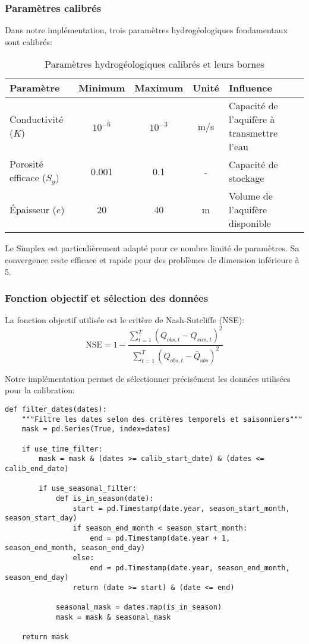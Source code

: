 \subsubsection{Paramètres calibrés}

Dans notre implémentation, trois paramètres hydrogéologiques fondamentaux sont calibrés:

\begin{table}[h]
\centering
\caption{Paramètres hydrogéologiques calibrés et leurs bornes}
\label{tab:parametres_calibres}
\begin{tabular}{|l|c|c|c|l|}
\hline
\textbf{Paramètre} & \textbf{Minimum} & \textbf{Maximum} & \textbf{Unité} & \textbf{Influence} \\
\hline
Conductivité ($K$) & $10^{-6}$ & $10^{-3}$ & m/s & Capacité de l'aquifère à transmettre l'eau \\
\hline
Porosité efficace ($S_y$) & 0.001 & 0.1 & - & Capacité de stockage \\
\hline
Épaisseur ($e$) & 20 & 40 & m & Volume de l'aquifère disponible \\
\hline
\end{tabular}
\end{table}

Le Simplex est particulièrement adapté pour ce nombre limité de paramètres. Sa convergence reste efficace et rapide pour des problèmes de dimension inférieure à 5.

\subsubsection{Fonction objectif et sélection des données}

La fonction objectif utilisée est le critère de Nash-Sutcliffe (NSE):
\begin{equation}\label{eq:nse}
\text{NSE} = 1 - \frac{\sum_{t=1}^{T}(Q_{obs,t} - Q_{sim,t})^2}{\sum_{t=1}^{T}(Q_{obs,t} - \bar{Q}_{obs})^2}
\end{equation}

Notre implémentation permet de sélectionner précisément les données utilisées pour la calibration:

\begin{verbatim}
def filter_dates(dates):
    """Filtre les dates selon des critères temporels et saisonniers"""
    mask = pd.Series(True, index=dates)
    
    if use_time_filter:
        mask = mask & (dates >= calib_start_date) & (dates <= calib_end_date)
    
        if use_seasonal_filter:
            def is_in_season(date):
                start = pd.Timestamp(date.year, season_start_month, season_start_day)
                if season_end_month < season_start_month:
                    end = pd.Timestamp(date.year + 1, season_end_month, season_end_day)
                else:
                    end = pd.Timestamp(date.year, season_end_month, season_end_day)
                return (date >= start) & (date <= end)
            
            seasonal_mask = dates.map(is_in_season)
            mask = mask & seasonal_mask

    return mask
\end{verbatim}

